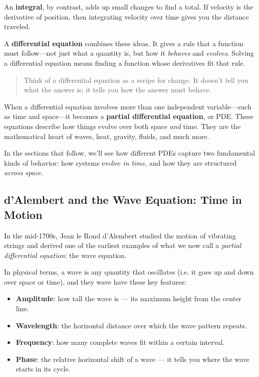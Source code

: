 An \textbf{integral}, by contrast, adds up small changes to find a total. If velocity is the derivative of position, then integrating velocity over time gives you the distance traveled.

A \textbf{differential equation} combines these ideas. It gives a rule that a function must follow—not just what a quantity is, but how it \textit{behaves} and \textit{evolves}. Solving a differential equation means finding a function whose derivatives fit that rule.

\begin{quote}
Think of a differential equation as a recipe for change. It doesn’t tell you what the answer is; it tells you how the answer must behave.
\end{quote}

When a differential equation involves more than one independent variable—such as time and space—it becomes a \textbf{partial differential equation}, or PDE. These equations describe how things evolve over both space \textit{and} time. They are the mathematical heart of waves, heat, gravity, fluids, and much more.

In the sections that follow, we’ll see how different PDEs capture two fundamental kinds of behavior: how systems evolve \textit{in time}, and how they are structured \textit{across space}.



\subsection{d’Alembert and the Wave Equation: Time in Motion}

In the mid-1700s, Jean le Rond d’Alembert studied the motion of vibrating strings and derived one of the earliest examples of what we now call a \textit{partial differential equation}: the wave equation.

In physical terms, a wave is any quantity that oscillates (i.e. it goes up and down over space or time), and they wave have these key features:

\begin{itemize}
  \item \textbf{Amplitude}: how tall the wave is — its maximum height from the center line.
  \item \textbf{Wavelength}: the horizontal distance over which the wave pattern repeats.
  \item \textbf{Frequency}: how many complete waves fit within a certain interval.
  \item \textbf{Phase}: the relative horizontal shift of a wave — it tells you where the wave starts in its cycle.
\end{itemize}

